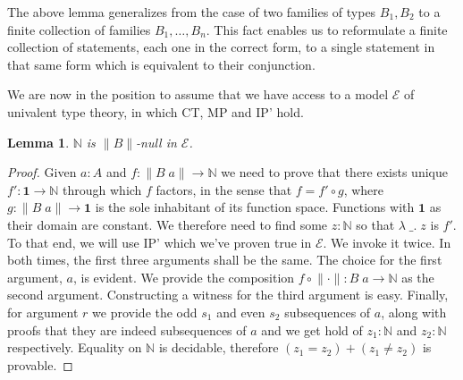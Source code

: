 \documentclass[12pt]{report}
\newtheorem{lem}[thm]{Lemma}
\begin{document}
The above lemma generalizes from the case of two families of types $B_1, B_2$ to a finite collection of families $B_1,\ldots,B_n$. 
This fact enables us to reformulate a finite collection of statements, each one in the correct form, to a single statement in that same form which is equivalent to their conjunction. 

We are now in the position to assume that we have access to a model $\mathcal{E}$ of univalent type theory, in which CT, MP and IP' hold. 

\begin{lem}\label{NisBnull}
$\mathbb{N}$ is $\lVert B \rVert$-null in $\mathcal{E}$.
\end{lem}
\begin{proof}
Given $a : A$ and $f : \lVert B\; a \rVert \rightarrow \mathbb{N}$ we need to prove that there exists unique $f' : \mathbf{1} \rightarrow \mathbb{N}$ through which $f$ factors, in the sense that $f = f' \circ g$, where $g : \lVert B\; a \rVert \rightarrow \mathbf{1}$ is the sole inhabitant of its function space. 
Functions with $\mathbf{1}$ as their domain are constant. 
We therefore need to find some $z : \mathbb{N}$ so that $\lambda\; \_.\; z$ is $f'$. 
To that end, we will use IP' which we've proven true in $\mathcal{E}$. 
We invoke it twice. 
In both times, the first three arguments shall be the same. 
The choice for the first argument, $a$, is evident. 
We provide the composition $f \circ \lVert\cdot\rVert : B\; a \rightarrow \mathbb{N}$ as the second argument. 
Constructing a witness for the third argument is easy. 
Finally, for argument $r$ we provide the odd $s_1$ and even $s_2$ subsequences of $a$, along with proofs that they are indeed subsequences of $a$ and we get hold of $z_1 : \mathbb{N}$ and $z_2 : \mathbb{N} $ respectively. 
Equality on $\mathbb{N}$ is decidable, therefore $(z_1 = z_2) + (z_1 \neq z_2)$ is provable. 


\end{proof}
\end{document}
